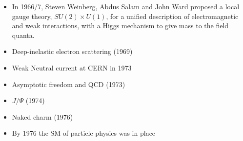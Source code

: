 \begin{itemize}
    \item In 1966/7, Steven Weinberg, Abdus Salam and John Ward proposed a local gauge theory, $SU(2) \times U(1)$, for a unified description of electromagnetic and weak interactions, with a Higgs mechanism to give mass to the field quanta.
    \item Deep-inelastic electron scattering (1969)
    \item Weak Neutral current at CERN in 1973
    \item Asymptotic freedom and QCD (1973)
    \item $J/\Psi$ (1974)
    \item Naked charm (1976)
    \item By 1976 the SM of particle physics was in place
\end{itemize}
